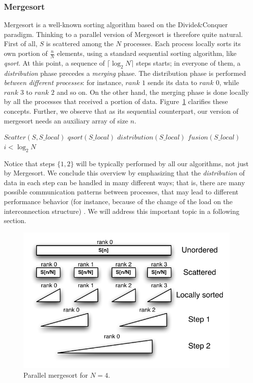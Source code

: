 \subsubsection{Mergesort}
Mergesort is a well-known sorting algorithm based on the Divide$\&$Conquer paradigm. Thinking to a parallel version of Mergesort is therefore quite natural. First of all, $S$ is scattered among the $N$ processes. Each process locally sorts its own portion of $\frac{n}{N}$ elements, using a standard sequential sorting algorithm, like \textit{qsort}. At this point, a sequence of $\lceil \log_{2}{N} \rceil$ steps starts; in everyone of them, a \textit{distribution} phase precedes a \textit{merging} phase. The distribution phase is performed \textit{between different processes}: for instance, $rank$ $1$ sends its data to $rank$ $0$, while $rank$ $3$ to $rank$ $2$ and so on. On the other hand, the merging phase is done locally by all the processes that received a portion of data. Figure~\ref{merge-dist} clarifies these concepts. Further, we observe that as its sequential counterpart, our version of mergesort needs an auxiliary array of size $n$. 
\begin{algorithmic}[1]  
	\medskip
	\STATE $Scatter( S, S\_local )$
	\STATE $qsort( S\_local )$
	\REPEAT 
		\STATE $distribution( S\_local )$
		\STATE $fusion ( S\_local )$
	\UNTIL $i < \log_{2}{N}$
	\medskip
\label{alg1}
\end{algorithmic}
Notice that steps $\lbrace 1, 2 \rbrace$ will be typically performed by all our algorithms, not just by Mergesort. We conclude this overview by emphasizing that the \textit{distribution} of data in each step can be handled in many different ways; that is, there are many possible communication patterns between processes, that may lead to different performance behavior (for instance, because of the change of the load on the interconnection structure) . We will address this important topic in a following section.

\begin{figure}[h]
        \centerline{
               \mbox{\includegraphics[scale=0.70]{mergesort-pict1}}
        }
        \caption{Parallel mergesort for $N = 4$.}
        \label{merge-dist}
\end{figure}

